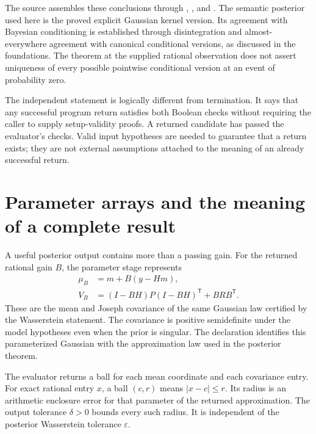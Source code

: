 The source assembles these conclusions through ,
, and
. The semantic posterior used here
is the proved explicit Gaussian kernel version. Its agreement with Bayesian
conditioning is established through disintegration and almost-everywhere agreement
with canonical conditional versions, as discussed in the foundations. The theorem
at the supplied rational observation does not assert uniqueness of every possible
pointwise conditional version at an event of probability zero.

The independent statement  is logically different from
termination. It says that any successful program return satisfies both Boolean
checks without requiring the caller to supply setup-validity proofs. A returned
candidate has passed the evaluator's checks. Valid input hypotheses are needed
to guarantee that a return exists; they are not external assumptions attached to
the meaning of an already successful return.

\section{Parameter arrays and the meaning of a complete result}
\label{sec:solver-output}

A useful posterior output contains more than a passing gain. For the returned
rational gain $B$, the parameter stage represents
\begin{align}
 \mu_B&=m+B(y-Hm),\nonumber\\
 V_B&=(I-BH)P(I-BH)^{\mathsf T}+BRB^{\mathsf T}.
 \label{eq:solver-joseph-output}
\end{align}
These are the mean and Joseph covariance of the same Gaussian law certified by
the Wasserstein statement. The covariance is positive semidefinite under the model
hypotheses even when the prior is singular. The declaration
 identifies this parameterized Gaussian
with the approximation law used in the posterior theorem.

The evaluator returns a ball for each mean coordinate and each covariance entry.
For exact rational entry $x$, a ball $(c,r)$ means $|x-c|\le r$. Its radius is an
arithmetic enclosure error for that parameter of the returned approximation.
The output tolerance $\delta>0$ bounds every such radius. It is independent of
the posterior Wasserstein tolerance $\varepsilon$.

